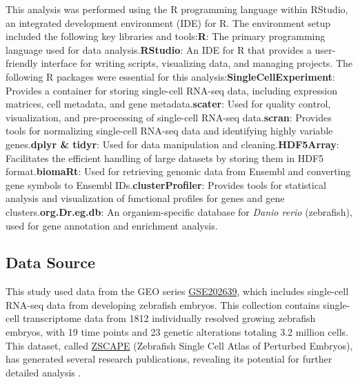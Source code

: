 \documentclass[runningheads]{llncs}
\begin{document}
This analysis was performed using the R programming language within RStudio, an integrated development environment (IDE) for R. The environment setup included the following key libraries and tools:\newline\textbf{R}: The primary programming language used for data analysis.\newline\textbf{RStudio}: An IDE for R that provides a user-friendly interface for writing scripts, visualizing data, and managing projects.
\newline The following R packages were essential for this analysis:\newline\textbf{SingleCellExperiment}: Provides a container for storing single-cell RNA-seq data, including expression matrices, cell metadata, and gene metadata.\newline\textbf{scater}: Used for quality control, visualization, and pre-processing of single-cell RNA-seq data.\newline\textbf{scran}: Provides tools for normalizing single-cell RNA-seq data and identifying highly variable genes.\newline\textbf{dplyr \& tidyr}: Used for data manipulation and cleaning.\newline\textbf{HDF5Array}: Facilitates the efficient handling of large datasets by storing them in HDF5 format.\newline\textbf{biomaRt}: Used for retrieving genomic data from Ensembl and converting gene symbols to Ensembl IDs.\newline\textbf{clusterProfiler}: Provides tools for statistical analysis and visualization of functional profiles for genes and gene clusters.\newline\textbf{org.Dr.eg.db}: An organism-specific database for \textit{Danio rerio} (zebrafish), used for gene annotation and enrichment analysis.

\subsection*{Data Source}
This study used data from the GEO series \href{https://www.ncbi.nlm.nih.gov/geo/query/acc.cgi?acc=GSE202639}{GSE202639}, which includes single-cell RNA-seq data from developing zebrafish embryos. This collection contains single-cell transcriptome data from 1812 individually resolved growing zebrafish embryos, with 19 time points and 23 genetic alterations totaling 3.2 million cells. This dataset, called \href{https://cole-trapnell-lab.github.io/zscape/}{ZSCAPE} (Zebrafish Single Cell Atlas of Perturbed Embryos), has generated several research publications, revealing its potential for further detailed analysis \cite{saunders2023embryo,dorrity2023proteostasis}.
\end{document}
